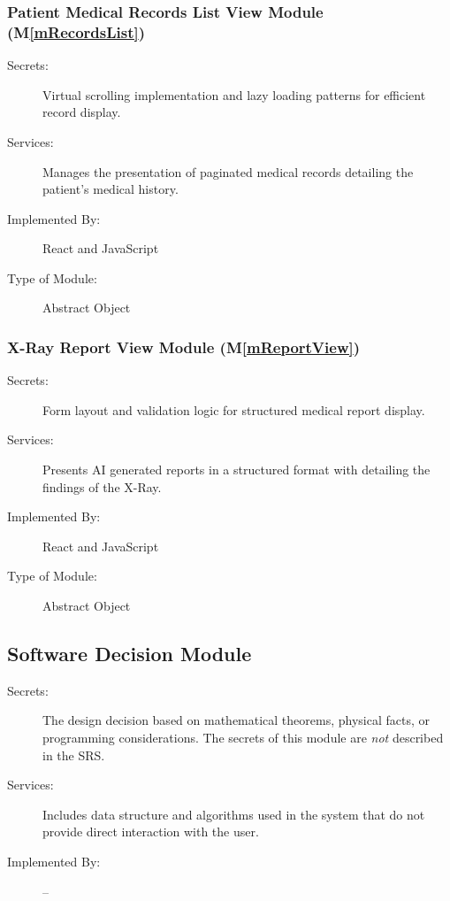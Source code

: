 \documentclass[12pt, titlepage]{article}
\newcommand{\mref}[1]{M\ref{#1}}
\begin{document}
\subsubsection{Patient Medical Records List View Module (\mref{mRecordsList})}
\begin{description}
\item[Secrets:] Virtual scrolling implementation and lazy loading patterns for efficient record display.
\item[Services:] Manages the presentation of paginated medical records detailing the patient's medical history.
\item[Implemented By:] React and JavaScript
\item[Type of Module:] Abstract Object
\end{description}

\subsubsection{X-Ray Report View Module (\mref{mReportView})}
\begin{description}
\item[Secrets:] Form layout and validation logic for structured medical report display.
\item[Services:] Presents AI generated reports in a structured format with detailing the findings of the X-Ray.
\item[Implemented By:] React and JavaScript
\item[Type of Module:] Abstract Object
\end{description}


\subsection{Software Decision Module}

\begin{description}
\item[Secrets:] The design decision based on mathematical theorems, physical
  facts, or programming considerations. The secrets of this module are
  \emph{not} described in the SRS.
\item[Services:] Includes data structure and algorithms used in the system that
  do not provide direct interaction with the user. 
\item[Implemented By:] --
\end{description}
\end{document}
